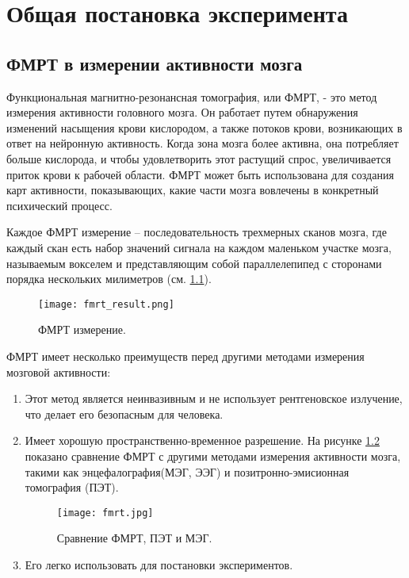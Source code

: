 \documentclass[pdftex,ptm,12pt,a4paper]{report}
\theoremstyle{definition}
\begin{document}
\tableofcontents

\sloppy


\chapter{Общая постановка эксперимента}
\section{ФМРТ в измерении активности мозга}

Функциональная магнитно-резонансная томография, или ФМРТ, - это метод измерения активности головного мозга. Он работает путем обнаружения изменений насыщения крови кислородом, а также потоков крови, возникающих в ответ на нейронную активность. Когда зона мозга более активна, она потребляет больше кислорода, и чтобы удовлетворить этот растущий спрос, увеличивается приток крови к рабочей области. ФМРТ может быть использована для создания карт активности, показывающих, какие части мозга вовлечены в конкретный психический процесс.

Каждое ФМРТ измерение -- последовательность трехмерных сканов мозга, где каждый скан есть набор значений сигнала на каждом маленьком участке мозга, называемым вокселем и представляющим собой параллелепипед с сторонами порядка нескольких милиметров (см. \ref{fmri_result}).


\begin{figure}[h]
\texttt{[image: fmrt\_result.png]}
\centering
\caption{ФМРТ измерение.}
\label{fmri_result}
\end{figure}

ФМРТ имеет несколько преимуществ перед другими методами измерения мозговой активности:
\begin{enumerate}
\item Этот метод является неинвазивным и не использует рентгеновское излучение, что делает его безопасным для человека.

\item Имеет хорошую пространственно-временное разрешение. На рисунке \ref{fmri} показано сравнение ФМРТ с другими методами измерения активности мозга, такими как энцефалография(МЭГ, ЭЭГ) и позитронно-эмисионная томография (ПЭТ).

\begin{figure}[h]
\texttt{[image: fmrt.jpg]}
\centering
\caption{Сравнение ФМРТ, ПЭТ и МЭГ.}
\label{fmri}
\end{figure}

\item Его легко использовать для постановки экспериментов.
\end{enumerate}
\end{document}
